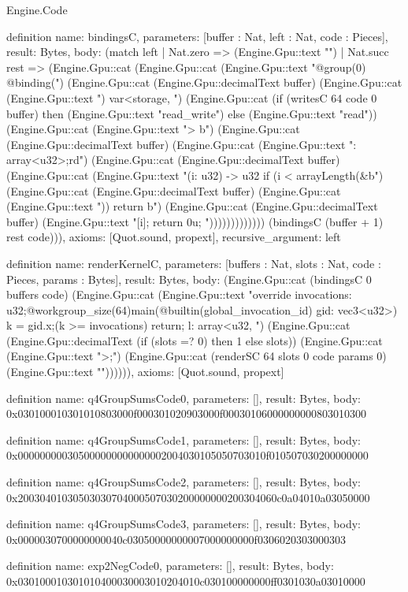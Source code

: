 \begin{lexlean}{Engine.Code}
\begin{semanticmodule}
definition{
  name: bindingsC,
  parameters: [buffer : Nat, left : Nat, code : Pieces],
  result: Bytes,
  body: (match left
    | Nat.zero => (Engine.Gpu::text "")
    | Nat.succ rest => (Engine.Gpu::cat (Engine.Gpu::cat (Engine.Gpu::text "@group(0) @binding(") (Engine.Gpu::cat (Engine.Gpu::decimalText buffer) (Engine.Gpu::cat (Engine.Gpu::text ") var<storage, ") (Engine.Gpu::cat (if (writesC 64 code 0 buffer) then (Engine.Gpu::text "read_write") else (Engine.Gpu::text "read")) (Engine.Gpu::cat (Engine.Gpu::text "> b") (Engine.Gpu::cat (Engine.Gpu::decimalText buffer) (Engine.Gpu::cat (Engine.Gpu::text ": array<u32>;\nfn rd") (Engine.Gpu::cat (Engine.Gpu::decimalText buffer) (Engine.Gpu::cat (Engine.Gpu::text "(i: u32) -> u32 { if (i < arrayLength(&b") (Engine.Gpu::cat (Engine.Gpu::decimalText buffer) (Engine.Gpu::cat (Engine.Gpu::text ")) { return b") (Engine.Gpu::cat (Engine.Gpu::decimalText buffer) (Engine.Gpu::text "[i]; } return 0u; }\n"))))))))))))) (bindingsC (buffer + 1) rest code))),
  axioms: [Quot.sound, propext],
  recursive_argument: left
}

definition{
  name: renderKernelC,
  parameters: [buffers : Nat, slots : Nat, code : Pieces, params : Bytes],
  result: Bytes,
  body: (Engine.Gpu::cat (bindingsC 0 buffers code) (Engine.Gpu::cat (Engine.Gpu::text "override invocations: u32;\n@compute @workgroup_size(64)\nfn main(@builtin(global_invocation_id) gid: vec3<u32>) {\nlet k = gid.x;\nif (k >= invocations) { return; }\nvar l: array<u32, ") (Engine.Gpu::cat (Engine.Gpu::decimalText (if (slots =? 0) then 1 else slots)) (Engine.Gpu::cat (Engine.Gpu::text ">;\n") (Engine.Gpu::cat (renderSC 64 slots 0 code params 0) (Engine.Gpu::text "}\n")))))),
  axioms: [Quot.sound, propext]
}

definition{
  name: q4GroupSumsCode0,
  parameters: [],
  result: Bytes,
  body: 0x030100010301010803000f000301020903000f00030106000000000803010300
}

definition{
  name: q4GroupSumsCode1,
  parameters: [],
  result: Bytes,
  body: 0x000000000305000000000000002004030105050703010f010507030200000000
}

definition{
  name: q4GroupSumsCode2,
  parameters: [],
  result: Bytes,
  body: 0x20030401030503030704000507030200000000200304060c0a04010a03050000
}

definition{
  name: q4GroupSumsCode3,
  parameters: [],
  result: Bytes,
  body: 0x0000030700000000040c03050000000007000000000f0306020303000303
}

definition{
  name: exp2NegCode0,
  parameters: [],
  result: Bytes,
  body: 0x030100010301010400030003010204010c030100000000ff0301030a03010000
}


\end{semanticmodule}
\end{lexlean}
